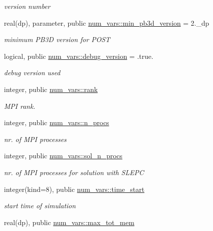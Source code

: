 \begin{DoxyCompactItemize}
\begin{DoxyCompactList}\small\item\em version number \end{DoxyCompactList}\item 
real(dp), parameter, public \hyperlink{namespacenum__vars_a7188b02fe090f6e8891fdd26f604284f}{num\+\_\+vars\+::min\+\_\+pb3d\+\_\+version} = 2.\+\_\+dp
\begin{DoxyCompactList}\small\item\em minimum P\+B3D version for P\+O\+ST \end{DoxyCompactList}\item 
logical, public \hyperlink{namespacenum__vars_a60589d0e73cbffd69d115c1f709745a2}{num\+\_\+vars\+::debug\+\_\+version} = .true.
\begin{DoxyCompactList}\small\item\em debug version used \end{DoxyCompactList}\item 
integer, public \hyperlink{namespacenum__vars_ab47aa91445feaedb05ac9d1a584664fe}{num\+\_\+vars\+::rank}
\begin{DoxyCompactList}\small\item\em M\+PI rank. \end{DoxyCompactList}\item 
integer, public \hyperlink{namespacenum__vars_a3a1f41c66c3d91fc749bcffd177b0662}{num\+\_\+vars\+::n\+\_\+procs}
\begin{DoxyCompactList}\small\item\em nr. of M\+PI processes \end{DoxyCompactList}\item 
integer, public \hyperlink{namespacenum__vars_a03373a7c9a040867e8108023f2ccf479}{num\+\_\+vars\+::sol\+\_\+n\+\_\+procs}
\begin{DoxyCompactList}\small\item\em nr. of M\+PI processes for solution with S\+L\+E\+PC \end{DoxyCompactList}\item 
integer(kind=8), public \hyperlink{namespacenum__vars_a70922471370a77597325ce9ef7b897a2}{num\+\_\+vars\+::time\+\_\+start}
\begin{DoxyCompactList}\small\item\em start time of simulation \end{DoxyCompactList}\item 
real(dp), public \hyperlink{namespacenum__vars_ae50396b7028248358850b4524cf84433}{num\+\_\+vars\+::max\+\_\+tot\+\_\+mem}

\end{DoxyCompactItemize}
